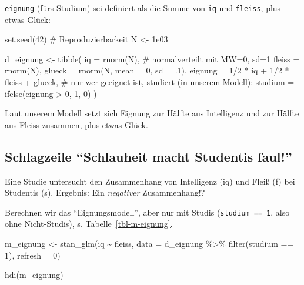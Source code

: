 \documentclass[
  a4paper,
  DIV=11]{scrreprt}
\newenvironment{Shaded}{\begin{snugshade}}{\end{snugshade}}
\newcommand{\AttributeTok}[1]{\textcolor[rgb]{0.40,0.45,0.13}{#1}}
\newcommand{\CommentTok}[1]{\textcolor[rgb]{0.37,0.37,0.37}{#1}}
\newcommand{\DecValTok}[1]{\textcolor[rgb]{0.68,0.00,0.00}{#1}}
\newcommand{\FloatTok}[1]{\textcolor[rgb]{0.68,0.00,0.00}{#1}}
\newcommand{\FunctionTok}[1]{\textcolor[rgb]{0.28,0.35,0.67}{#1}}
\newcommand{\NormalTok}[1]{\textcolor[rgb]{0.00,0.23,0.31}{#1}}
\newcommand{\OtherTok}[1]{\textcolor[rgb]{0.00,0.23,0.31}{#1}}
\newcommand{\SpecialCharTok}[1]{\textcolor[rgb]{0.37,0.37,0.37}{#1}}
\theoremstyle{definition}
\theoremstyle{remark}
\begin{document}
\texttt{eignung} (fürs Studium) sei definiert als die Summe von
\texttt{iq} und \texttt{fleiss}, plus etwas Glück:

\begin{Shaded}
\begin{Highlighting}[]
\FunctionTok{set.seed}\NormalTok{(}\DecValTok{42}\NormalTok{)  }\CommentTok{\# Reproduzierbarkeit}
\NormalTok{N }\OtherTok{\textless{}{-}} \FloatTok{1e03}  

\NormalTok{d\_eignung }\OtherTok{\textless{}{-}}
\FunctionTok{tibble}\NormalTok{(}
  \AttributeTok{iq =} \FunctionTok{rnorm}\NormalTok{(N),  }\CommentTok{\# normalverteilt mit MW=0, sd=1}
  \AttributeTok{fleiss =} \FunctionTok{rnorm}\NormalTok{(N),}
  \AttributeTok{glueck =} \FunctionTok{rnorm}\NormalTok{(N, }\AttributeTok{mean =} \DecValTok{0}\NormalTok{, }\AttributeTok{sd =}\NormalTok{ .}\DecValTok{1}\NormalTok{),}
  \AttributeTok{eignung =} \DecValTok{1}\SpecialCharTok{/}\DecValTok{2} \SpecialCharTok{*}\NormalTok{ iq }\SpecialCharTok{+} \DecValTok{1}\SpecialCharTok{/}\DecValTok{2} \SpecialCharTok{*}\NormalTok{ fleiss }\SpecialCharTok{+}\NormalTok{ glueck,}
  \CommentTok{\# nur wer geeignet ist, studiert (in unserem Modell):}
  \AttributeTok{studium =} \FunctionTok{ifelse}\NormalTok{(eignung }\SpecialCharTok{\textgreater{}} \DecValTok{0}\NormalTok{, }\DecValTok{1}\NormalTok{, }\DecValTok{0}\NormalTok{) }
\NormalTok{  )}
\end{Highlighting}
\end{Shaded}

Laut unserem Modell setzt sich Eignung zur Hälfte aus Intelligenz und
zur Hälfte aus Fleiss zusammen, plus etwas Glück.

\hypertarget{schlagzeile-schlauheit-macht-studentis-faul}{%
\subsection{Schlagzeile ``Schlauheit macht Studentis
faul!''}\label{schlagzeile-schlauheit-macht-studentis-faul}}

Eine Studie untersucht den Zusammenhang von Intelligenz (iq) und Fleiß
(f) bei Studentis (s). Ergebnis: Ein \emph{negativer} Zusammenhang!?

Berechnen wir das ``Eignungsmodell'', aber nur mit Studis
(\texttt{studium\ ==\ 1}, also ohne Nicht-Studis), s.
Tabelle~\ref{tbl-m-eignung}.

\begin{Shaded}
\begin{Highlighting}[]
\NormalTok{m\_eignung }\OtherTok{\textless{}{-}}
  \FunctionTok{stan\_glm}\NormalTok{(iq }\SpecialCharTok{\textasciitilde{}}\NormalTok{ fleiss, }\AttributeTok{data =}\NormalTok{ d\_eignung }\SpecialCharTok{\%\textgreater{}\%}  \FunctionTok{filter}\NormalTok{(studium }\SpecialCharTok{==} \DecValTok{1}\NormalTok{), }\AttributeTok{refresh =} \DecValTok{0}\NormalTok{)}

\FunctionTok{hdi}\NormalTok{(m\_eignung)}
\end{Highlighting}
\end{Shaded}
\end{document}
